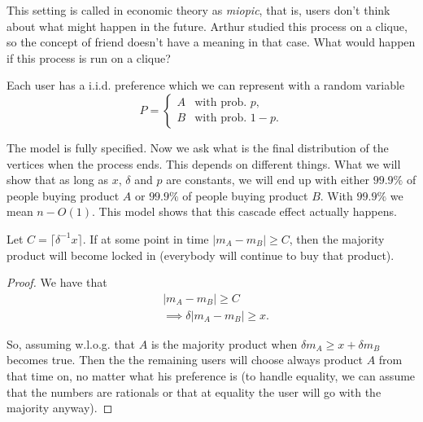 This setting is called in economic theory as \emph{miopic}, that is, users don't think about what might happen in the future. Arthur studied this process on a clique, so the concept of friend doesn't have a meaning in that case. What would happen if this process is run on a clique?

Each user has a i.i.d. preference which we can represent with a random variable
\begin{equation}
	P = \begin{cases}
	A & \text{with prob. } p,\\
	B & \text{with prob. } 1 -p.
	\end{cases}
\end{equation}

The model is fully specified. Now we ask what is the final distribution of the vertices when the process ends. This depends on different things. What we will show that as long as $x$, $\delta$ and $p$ are constants, we will end up with either $99.9\%$ of people buying product $A$ or $99.9\%$ of people buying product $B$. With $99.9\%$ we mean $n - O(1)$. This model shows that this cascade effect actually happens.

\begin{lem} \label{lem:arth:c}
	Let $C = \lceil\delta^{-1}x\rceil$. If at some point in time $|m_A - m_B| \geq C$, then the majority product will become locked in (everybody will continue to buy that product).
\end{lem}
\begin{proof}
	We have that
	\begin{align}
		&|m_A - m_B| \geq C\\
		&\implies \delta|m_A - m_B| \geq x.
	\end{align}
	
	So, assuming w.l.o.g. that $A$ is the majority product when $\delta m_A \geq x + \delta m_B$ becomes true. Then the the remaining users will choose always product $A$ from that time on, no matter what his preference is (to handle equality, we can assume that the numbers are rationals or that at equality the user will go with the majority anyway).
\end{proof}

